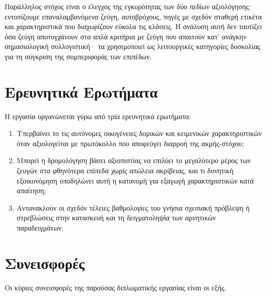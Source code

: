 Παράλληλος στόχος είναι ο έλεγχος της εγκυρότητας των δύο πεδίων αξιολόγησης:
εντοπίζουμε επαναλαμβανόμενα ζεύγη, αυτοβρόχους, πηγές με σχεδόν σταθερή ετικέτα
και χαρακτηριστικά που διαχωρίζουν εύκολα τις κλάσεις.
Η ανάλυση αυτή δεν
ταυτίζει όσα ζεύγη αποτυγχάνουν στα απλά κριτήρια με ζεύγη που απαιτούν κατ'
ανάγκην σημασιολογική συλλογιστική· τα χρησιμοποιεί ως λειτουργικές κατηγορίες
δυσκολίας για τη σύγκριση της συμπεριφοράς των επιπέδων.

\section{Ερευνητικά Ερωτήματα}
\label{sec:research-questions}

Η εργασία οργανώνεται γύρω από τρία ερευνητικά ερωτήματα:

\begin{enumerate}
    \item Υπερβαίνει το  τις αυτόνομες οικογένειες δομικών και
    κειμενικών χαρακτηριστικών όταν αξιολογείται με πρωτόκολλο που αποφεύγει
    διαρροή της ακμής-στόχου;
    \item Μπορεί η δρομολόγηση βάσει αξιοπιστίας να επιλύει το μεγαλύτερο μέρος
    των ζευγών στα φθηνότερα επίπεδα χωρίς απώλεια ακρίβειας, και τι δυνητική
    εξοικονόμηση υποδηλώνει αυτή η κατανομή για εξαγωγή χαρακτηριστικών κατά
    απαίτηση;
    \item Αντανακλούν οι σχεδόν τέλειες βαθμολογίες του  γνήσια
    σχεσιακή πρόβλεψη ή στρεβλώσεις στην κατασκευή και τη δειγματοληψία των
    αρνητικών παραδειγμάτων;
\end{enumerate}


\section{Συνεισφορές}
\label{sec:contributions}

Οι κύριες συνεισφορές της παρούσας διπλωματικής εργασίας είναι οι εξής.

